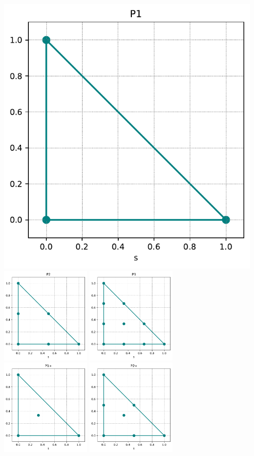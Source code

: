 \begin{center}
\includegraphics[width=4.cm]{python_codes/fieldstone_120/spaces/P1_nodes}
\includegraphics[width=4.5cm]{python_codes/fieldstone_120/spaces/P2_nodes}
\includegraphics[width=4.5cm]{python_codes/fieldstone_120/spaces/P3_nodes}\\
\includegraphics[width=4.5cm]{python_codes/fieldstone_120/spaces/P1+_nodes}
\includegraphics[width=4.5cm]{python_codes/fieldstone_120/spaces/P2+_nodes}
\end{center}

